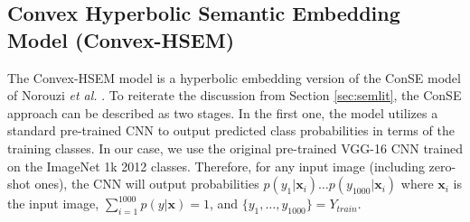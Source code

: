 \documentclass[12pt]{report}
\begin{document}
\subsection{Convex Hyperbolic Semantic Embedding Model (Convex-HSEM)}
The Convex-HSEM model is a hyperbolic embedding version of the ConSE model of Norouzi \textit{et al.} \cite{Norouzi2013}. To reiterate the discussion from Section \ref{sec:semlit}, the ConSE approach can be described as two stages. In the first one, the model utilizes a standard pre-trained CNN to output predicted class probabilities in terms of the training classes. In our case, we use the original pre-trained VGG-16 CNN trained on the ImageNet 1k 2012 classes. Therefore, for any input image (including zero-shot ones), the CNN will output probabilities $p(y_1|\mathbf{x}_i) \dots p(y_{1000}|\mathbf{x}_i)$ where $\mathbf{x}_i$ is the input image, $\sum_{i=1}^{1000}p(y|\mathbf{x})=1$, and $\{y_1, \dots, y_{1000}\}=Y_{train}$.
\end{document}
